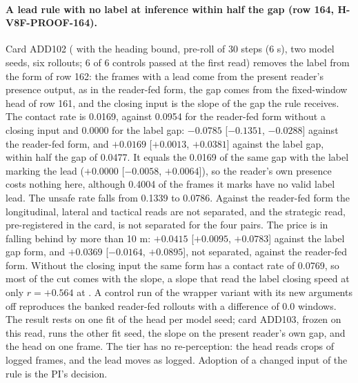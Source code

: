 \paragraph{A lead rule with no label at inference within half the gap (row 164, H-V8F-PROOF-164).} Card ADD102 ( with the heading bound, pre-roll of 30 steps (6 s), two model seeds, six rollouts; 6 of 6 controls passed at the first read) removes the label from the form of row 162: the frames with a lead come from the present reader's presence output, as in the reader-fed form, the gap comes from the fixed-window head of row 161, and the closing input is the slope of the gap the rule receives. The contact rate is 0.0169, against 0.0954 for the reader-fed form without a closing input and 0.0000 for the label gap: $-0.0785$ [$-0.1351$, $-0.0288$] against the reader-fed form, and $+0.0169$ [$+0.0013$, $+0.0381$] against the label gap, within half the gap of 0.0477. It equals the 0.0169 of the same gap with the label marking the lead ($+0.0000$ [$-0.0058$, $+0.0064$]), so the reader's own presence costs nothing here, although 0.4004 of the frames it marks have no valid label lead. The unsafe rate falls from 0.1339 to 0.0786. Against the reader-fed form the longitudinal, lateral and tactical reads are not separated, and the strategic read, pre-registered in the card, is not separated for the four pairs. The price is in falling behind by more than 10 m: $+0.0415$ [$+0.0095$, $+0.0783$] against the label gap form, and $+0.0369$ [$-0.0164$, $+0.0895$], not separated, against the reader-fed form. Without the closing input the same form has a contact rate of 0.0769, so most of the cut comes with the slope, a slope that read the label closing speed at only $r = +0.564$ at . A control run of the wrapper variant with its new arguments off reproduces the banked reader-fed rollouts with a difference of 0.0 windows. The result rests on one fit of the head per model seed; card ADD103, frozen on this read, runs the other fit seed, the slope on the present reader's own gap, and the head on one frame. The tier has no re-perception: the head reads crops of logged frames, and the lead moves as logged. Adoption of a changed input of the rule is the PI's decision.

